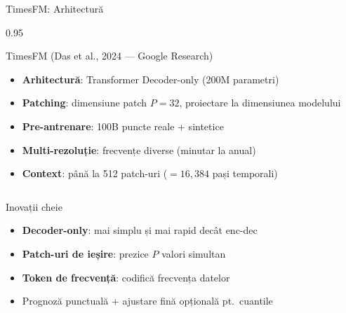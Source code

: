 \documentclass[9pt, aspectratio=169, t]{beamer}
\begin{document}
\begin{frame}{TimesFM: Arhitectură}
    \begin{cminipage}{0.95\textwidth}
    \vspace{-3mm}
    {\scriptsize
    \begin{block}{TimesFM (Das et al., 2024 --- Google Research)}
        \vspace{-1mm}
        \begin{itemize}\setlength{\itemsep}{0pt}
            \item \textbf{Arhitectură}: Transformer Decoder-only (200M parametri)
            \item \textbf{Patching}: dimensiune patch $P = 32$, proiectare la dimensiunea modelului
            \item \textbf{Pre-antrenare}: 100B puncte reale + sintetice
            \item \textbf{Multi-rezoluție}: frecvențe diverse (minutar la anual)
            \item \textbf{Context}: până la 512 patch-uri ($= 16{,}384$ pași temporali)
        \end{itemize}
        \vspace{-1mm}
    \end{block}
    \vspace{-3mm}
    \begin{columns}[T]
        \begin{exampleblock}{Inovații cheie}
            \begin{itemize}\setlength{\itemsep}{0pt}
                \item \textbf{Decoder-only}: mai simplu și mai rapid decât enc-dec
                \item \textbf{Patch-uri de ieșire}: prezice $P$ valori simultan
                \item \textbf{Token de frecvență}: codifică frecvența datelor
                \item Prognoză punctuală + ajustare fină opțională pt.\ cuantile
            \end{itemize}
        \end{exampleblock}


\end{columns}}
\end{cminipage}
\end{frame}
\end{document}
